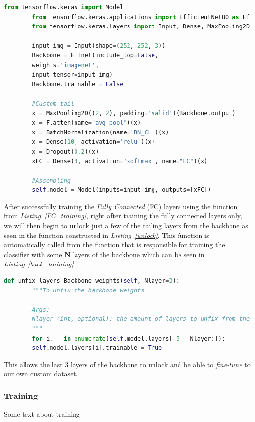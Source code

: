 \documentclass[12pt]{extarticle}
\begin{document}
	\begin{lstlisting}[language=Python, caption=Efficient Net Model python code, label=Effnet-Model]
		from tensorflow.keras import Model
		from tensorflow.keras.applications import EfficientNetB0 as Effnet
		from tensorflow.keras.layers import Input, Dense, MaxPooling2D, Flatten, Dropout, BatchNormalization
		
		input_img = Input(shape=(252, 252, 3))
		Backbone = Effnet(include_top=False,
		weights='imagenet',
		input_tensor=input_img)
		Backbone.trainable = False
		
		#Custom tail
		x = MaxPooling2D((2, 2), padding='valid')(Backbone.output)
		x = Flatten(name="avg_pool")(x)
		x = BatchNormalization(name='BN_CL')(x)
		x = Dense(10, activation='relu')(x)
		x = Dropout(0.2)(x)
		xFC = Dense(3, activation='softmax', name="FC")(x)
		
		#Assembling
		self.model = Model(inputs=input_img, outputs=[xFC])
	\end{lstlisting}
	
	After successfully training the \emph{Fully Connected} (FC) layers using the function from \emph{Listing~\ref{FC_training}}, right after training the fully connected layers only, we will then begin to unlock just a few of the tailing layers from the backbone as seen in the function constructed in \emph{Listing~\ref{unlock}}. This function is automatically called from the function that is responsible for training the classifier with some $\textbf{N}$ layers of the backbone which can be seen in \emph{Listing~\ref{back_training}}
	
	
	
	\begin{lstlisting}[language=Python, caption=Backbone layer unlocking function, label=unlock]
	def unfix_layers_Backbone_weights(self, Nlayer=3):
		"""To unfix the backbone weights
	
		Args:
		Nlayer (int, optional): the amount of layers to unfix from the end. Defaults to 3.
		"""
		for i, _ in enumerate(self.model.layers[-5 - Nlayer:]):
		self.model.layers[i].trainable = True
	\end{lstlisting}

	
	
	This allows the last 3 layers of the backbone to unlock and be able to \emph{fine-tune} to our own custom dataset.
	
	\subsubsection{Training}
	Some text about training 
	
\end{document}
